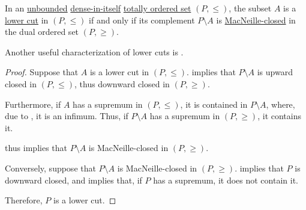 \begin{proposition}\label{thm:lower_cut_complements}
  In an \hyperref[def:extremal_points/bounds]{unbounded} \hyperref[def:dense_total_order]{dense-in-itself} \hyperref[def:totally_ordered_set]{totally ordered set} \( (P, \leq) \), the subset \( A \) is a \hyperref[def:lower_cut]{lower cut} in \( (P, \leq) \) if and only if its complement \( P \setminus A \) is \hyperref[def:macnielle_closure]{MacNeille-closed} in the dual ordered set \( (P, \geq) \).
\end{proposition}
\begin{comments}
  \item Another useful characterization of lower cuts is .
\end{comments}
\begin{proof}
  \SufficiencySubProof Suppose that \( A \) is a lower cut in \( (P, \leq) \).  implies that \( P \setminus A \) is upward closed in \( (P, \leq) \), thus downward closed in \( (P, \geq) \).

  Furthermore, if \( A \) has a supremum in \( (P, \leq) \), it is contained in \( P \setminus A \), where, due to , it is an infimum. Thus, if \( P \setminus A \) has a supremum in \( (P, \geq) \), it contains it.

   thus implies that \( P \setminus A \) is MacNeille-closed in \( (P, \geq) \).

  \NecessitySubProof Conversely, suppose that \( P \setminus A \) is MacNeille-closed in \( (P, \geq) \).  implies that \( P \) is downward closed, and  implies that, if \( P \) has a supremum, it does not contain it.

  Therefore, \( P \) is a lower cut.
\end{proof}


